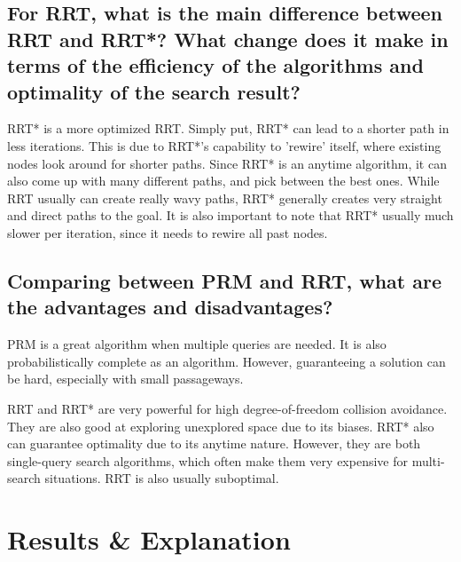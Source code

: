 \documentclass[journal]{IEEEtran}
\begin{document}
    \subsection{For RRT, what is the main difference between RRT and RRT*? What change does it make in terms of the efficiency of the algorithms and optimality of the search result?}
    RRT* is a more optimized RRT. Simply put, RRT* can lead to a shorter path in less iterations. This is due to RRT*'s capability to 'rewire' itself, where existing nodes look around for shorter paths. Since RRT* is an anytime algorithm, it can also come up with many different paths, and pick between the best ones. While RRT usually can create really wavy paths, RRT* generally creates very straight and direct paths to the goal. It is also important to note that RRT* usually much slower per iteration, since it needs to rewire all past nodes.

    \subsection{Comparing between PRM and RRT, what are the advantages and disadvantages?}
    
    PRM is a great algorithm when multiple queries are needed. It is also probabilistically complete as an algorithm. However, guaranteeing a solution can be hard, especially with small passageways.

    RRT and RRT* are very powerful for high degree-of-freedom collision avoidance. They are also good at exploring unexplored space due to its biases. RRT* also can guarantee optimality due to its anytime nature. However, they are both single-query search algorithms, which often make them very expensive for multi-search situations. RRT is also usually suboptimal.

    \section{Results \& Explanation}
\end{document}
